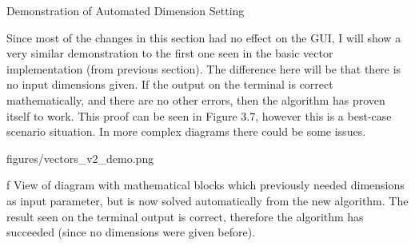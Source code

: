 \secc Demonstration of Automated Dimension Setting

\qquad Since most of the changes in this section had no effect on the GUI, I will show a very similar
demonstration to the first one seen in the basic vector implementation (from previous section). The difference
here will be that there is no input dimensions given. If the output on the terminal is correct mathematically,
and there are no other errors, then the algorithm has proven itself to work. This proof can be seen in Figure
3.7, however this is a best-case scenario situation. In more complex diagrams there could be some
issues.

\midinsert {}
\picw=14cm \cinspic figures/vectors_v2_demo.png
\caption/f View of diagram with mathematical blocks which previously needed dimensions as input parameter,
but is now solved automatically from the new algorithm. The result seen on the terminal output is correct,
therefore the algorithm has succeeded (since no dimensions were given before).
\endinsert